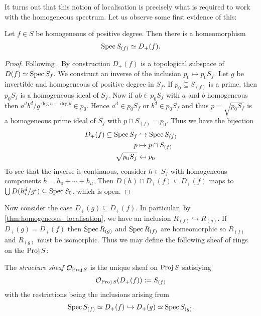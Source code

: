 \documentclass{article}
\begin{document}
It turns out that this notion of localisation is precisely what is
required to work with the homogeneous spectrum. Let us observe some
first evidence of this:

\begin{lemma}\label{thm:homogeneous_localisation}
  Let $f\in S$ be homogeneous of positive degree. Then there is
  a homeomorphism
  \begin{align*}
    \operatorname{Spec} S_{(f)} \simeq D_+(f).
  \end{align*}
  \begin{proof}
    Following \cite[\href{https://stacks.math.columbia.edu/tag/00JO}{Tag 00JO}]{stacks-project}.
    By construction $D_+(f)$ is a topological subspace of
    $D(f)\simeq\operatorname{Spec} S_f$.
    We construct an inverse of the inclusion $p_0\mapsto p_0 S_f$.
    Let $g$ be invertible and homogeneous of positive degree in
    $S_f$. If $p_0\subseteq S_{(f)}$ is a prime, then $p_0 S_f$
    is a homogeneous ideal of $S_f$. Now if $ab\in p_0 S_f$ with
    $a$ and $b$ homogeneous then $a^db^d/g^{\deg a + \deg b}\in p_0$.
    Hence $a^d\in p_0 S_f$ or $b^d\in p_0 S_f$ and thus $p=\sqrt{p_0 S_f}$ is a homogeneous prime ideal of $S_f$ with
    $p \cap S_{(f)} = p_0$. Thus we have the bijection
    \begin{align*}
      D_+(f) \subseteq \operatorname{Spec} S_f &\hookrightarrow \operatorname{Spec} S_{(f)} \\
      p &\mapsto p \cap S_{(f)} \\
      \sqrt{p_0 S_f} &\mapsfrom p_0
    \end{align*}
    To see that the inverse is continuous, consider $h\in S_f$
    with homogeneous components $h = h_0 + \cdots + h_d$. Then
    $D(h)\cap D_+(f)\subseteq D_+(f)$ maps to
    $\bigcup D(h_i^d / g^i)\subseteq \operatorname{Spec} S_0$, which is open.
  \end{proof}
\end{lemma}


Now consider the case $D_+(g)\subseteq D_+(f)$. In particular,
by \ref{thm:homogeneous_localisation}, we have an inclusion
$R_{(f)}\hookrightarrow R_{(g)}$. If $D_+(g)=D_+(f)$ then
$\operatorname{Spec} R_{(g)}$ and $\operatorname{Spec} R_{(f)}$ are homeomorphic so
$R_{(f)}$ and $R_{(g)}$ must be isomorphic.
Thus we may define the following sheaf of rings on the $\operatorname{Proj} S$:

\begin{definition}\label{def:structure_sheaf}
  The \emph{structure sheaf} $\mathcal O_{\operatorname{Proj} S}$ is the unique sheaf
  on $\operatorname{Proj} S$ satisfying
  \begin{align}\label{eq:structure_sheaf}
    \mathcal O_{\operatorname{Proj} S}(D_+(f)) := S_{(f)}
  \end{align}
  with the restrictions being the inclusions arising from
  \begin{align*}
    \operatorname{Spec} S_{(f)} \simeq D_+(f) \hookrightarrow D_+(g) \simeq \operatorname{Spec} S_{(g)}.
  \end{align*}
\end{definition}
\end{document}
